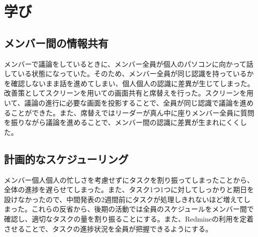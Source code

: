 \chapter{学び}

\section{メンバー間の情報共有}
メンバーで議論をしているときに、メンバー全員が個人のパソコンに向かって話している状態になっていた。そのため、メンバー全員が同じ認識を持っているかを確認しないまま話を進めてしまい、個人個人の認識に差異が生じてしまった。改善策としてスクリーンを用いての画面共有と席替えを行った。スクリーンを用いて、議論の進行に必要な画面を投影することで、全員が同じ認識で議論を進めることができた。また、席替えではリーダーが真ん中に座りメンバー全員に質問を振りながら議論を進めることで、メンバー間の認識に差異が生まれにくくした。
\section{計画的なスケジューリング}
メンバー個人個人の忙しさを考慮せずにタスクを割り振ってしまったことから、全体の進捗を遅らせてしまった。また、タスク1つ1つに対してしっかりと期日を設けなかったので、中間発表の2週間前にタスクが処理しきれないほど増えてしまった。これらの反省から、後期の活動では全員のスケジュールをメンバー間で確認し、適切なタスクの量を割り振ることにする。また、Redmineの利用を定着させることで、タスクの進捗状況を全員が把握できるようにする。
